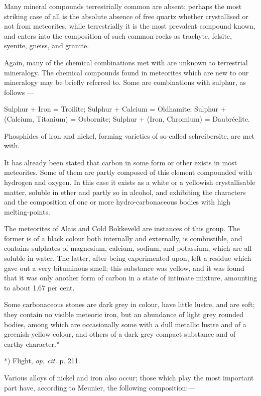 \documentclass[a4paper, 12pt, oneside, polutonikogreek, english]{article}
\begin{document}
Many mineral compounds terrestrially common are absent; perhaps the most striking case of all is the absolute absence of free quartz whether crystallised or not from meteorites, while terrestrially it is the most prevalent compound known, and enters into the composition of such common rocks as trachyte, felsite, syenite, gneiss, and granite.

Again, many of the chemical combinations met with are unknown to terrestrial mineralogy. The chemical compounds found in meteorites which are new to our mineralogy may be briefly referred to. Some are combinations with sulphur, as follows ---

Sulphur + Iron = Troilite; 
Sulphur + Calcium = Oldhamite; 
Sulphur + (Calcium, Titanium) = Osbornite; 
Sulphur + (Iron, Chromium) = Daubréelite. 

Phosphides of iron and nickel, forming varieties of so-called schreibersite, are met with.

It has already been stated that carbon in some form or other exists in most meteorites. Some of them are partly composed of this element compounded with hydrogen and oxygen. In this case it exists as a white or a yellowish crystallisable matter, soluble in ether and partly so in alcohol, and exhibiting the characters and the composition of one or more hydro-carbonaceous bodies with high melting-points.

The meteorites of Alais and Cold Bokkeveld are instances of this group. The former is of a black colour both internally and externally, is combustible, and contains sulphates of magnesium, calcium, sodium, and potassium, which are all soluble in water. The latter, after being experimented upon, left a residue which gave out a very bituminous smell; this substance was yellow, and it was found that it was only another form of carbon in a state of intimate mixture, amounting to about 1.67 per cent.

Some carbonaceous stones are dark grey in colour, have little lustre, and are soft; they contain no visible meteoric iron, but an abundance of light grey rounded bodies, among which are occasionally some with a dull metallic lustre and of a greenish-yellow colour, and others of a dark grey compact substance and of earthy character.*

*) Flight, \emph{op. cit.} p. 211.

Various alloys of nickel and iron also occur; those which play the most important part have, according to Meunier, the following composition:---
\end{document}
